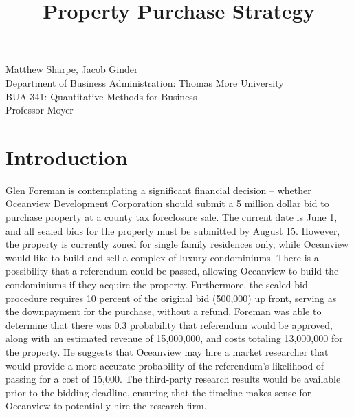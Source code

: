 \documentclass{article}
\title{\textbf{Property Purchase Strategy}}
\begin{document}
\maketitle


\begin{center}
    \large Matthew Sharpe, Jacob Ginder \\   Department of  Business Administration: Thomas More University \\  
    \large BUA 341: Quantitative Methods for Business \\  
    \large Professor Moyer \\  
\end{center}


\section{Introduction}


\indent Glen Foreman is contemplating a significant financial decision – whether Oceanview Development Corporation should submit a 5 million dollar bid to purchase property at a county tax foreclosure sale. The current date is June 1, and all sealed bids for the property must be submitted by August 15. However, the property is currently zoned for single family residences only, while Oceanview would like to build and sell a complex of luxury condominiums. There is a possibility that a referendum could be passed, allowing Oceanview to build the condominiums if they acquire the property. Furthermore, the sealed bid procedure requires 10 percent of the original bid (500,000) up front, serving as the downpayment for the purchase, without a refund. Foreman was able to determine that there was 0.3 probability that referendum would be approved, along with an estimated revenue of 15,000,000, and costs totaling 13,000,000 for the property. He suggests that Oceanview may hire a market researcher that would provide a more accurate probability of the referendum’s likelihood of passing for a cost of 15,000. The third-party research results would be available prior to the bidding deadline, ensuring that the timeline makes sense for Oceanview to potentially hire the research firm.\\ \\ \\ \\ \\ \\ \\

  
\end{document}
